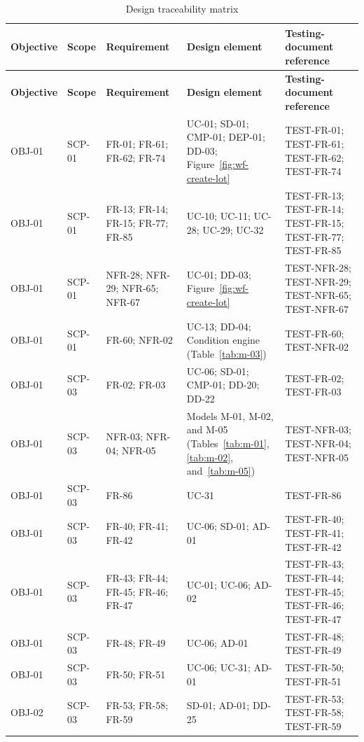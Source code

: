 {\footnotesize
\begin{longtable}{@{}>{\raggedright\arraybackslash}p{}>{\raggedright\arraybackslash}p{}>{\raggedright\arraybackslash}p{}>{\raggedright\arraybackslash}p{}>{\raggedright\arraybackslash}p{}@{}}
\caption{Design traceability matrix}\label{tab:traceability}\\
\toprule
\textbf{Objective} & \textbf{Scope} & \textbf{Requirement} & \textbf{Design element} & \textbf{Testing-document reference} \\
\midrule
\endfirsthead
\toprule
\textbf{Objective} & \textbf{Scope} & \textbf{Requirement} & \textbf{Design element} & \textbf{Testing-document reference} \\
\midrule
\endhead
OBJ-01 & SCP-01 & FR-01; FR-61; FR-62; FR-74 & UC-01; SD-01; CMP-01; DEP-01; DD-03; Figure~\ref{fig:wf-create-lot} & TEST-FR-01; TEST-FR-61; TEST-FR-62; TEST-FR-74 \\
OBJ-01 & SCP-01 & FR-13; FR-14; FR-15; FR-77; FR-85 & UC-10; UC-11; UC-28; UC-29; UC-32 & TEST-FR-13; TEST-FR-14; TEST-FR-15; TEST-FR-77; TEST-FR-85 \\
OBJ-01 & SCP-01 & NFR-28; NFR-29; NFR-65; NFR-67 & UC-01; DD-03; Figure~\ref{fig:wf-create-lot} & TEST-NFR-28; TEST-NFR-29; TEST-NFR-65; TEST-NFR-67 \\
OBJ-01 & SCP-01 & FR-60; NFR-02 & UC-13; DD-04; Condition engine (Table~\ref{tab:m-03}) & TEST-FR-60; TEST-NFR-02 \\
OBJ-01 & SCP-03 & FR-02; FR-03 & UC-06; SD-01; CMP-01; DD-20; DD-22 & TEST-FR-02; TEST-FR-03 \\
OBJ-01 & SCP-03 & NFR-03; NFR-04; NFR-05 & Models M-01, M-02, and M-05 (Tables~\ref{tab:m-01}, \ref{tab:m-02}, and~\ref{tab:m-05}) & TEST-NFR-03; TEST-NFR-04; TEST-NFR-05 \\
OBJ-01 & SCP-03 & FR-86 & UC-31 & TEST-FR-86 \\
OBJ-01 & SCP-03 & FR-40; FR-41; FR-42 & UC-06; SD-01; AD-01 & TEST-FR-40; TEST-FR-41; TEST-FR-42 \\
OBJ-01 & SCP-03 & FR-43; FR-44; FR-45; FR-46; FR-47 & UC-01; UC-06; AD-02 & TEST-FR-43; TEST-FR-44; TEST-FR-45; TEST-FR-46; TEST-FR-47 \\
OBJ-01 & SCP-03 & FR-48; FR-49 & UC-06; AD-01 & TEST-FR-48; TEST-FR-49 \\
OBJ-01 & SCP-03 & FR-50; FR-51 & UC-06; UC-31; AD-01 & TEST-FR-50; TEST-FR-51 \\
OBJ-02 & SCP-03 & FR-53; FR-58; FR-59 & SD-01; AD-01; DD-25 & TEST-FR-53; TEST-FR-58; TEST-FR-59 \\

\end{longtable}}
